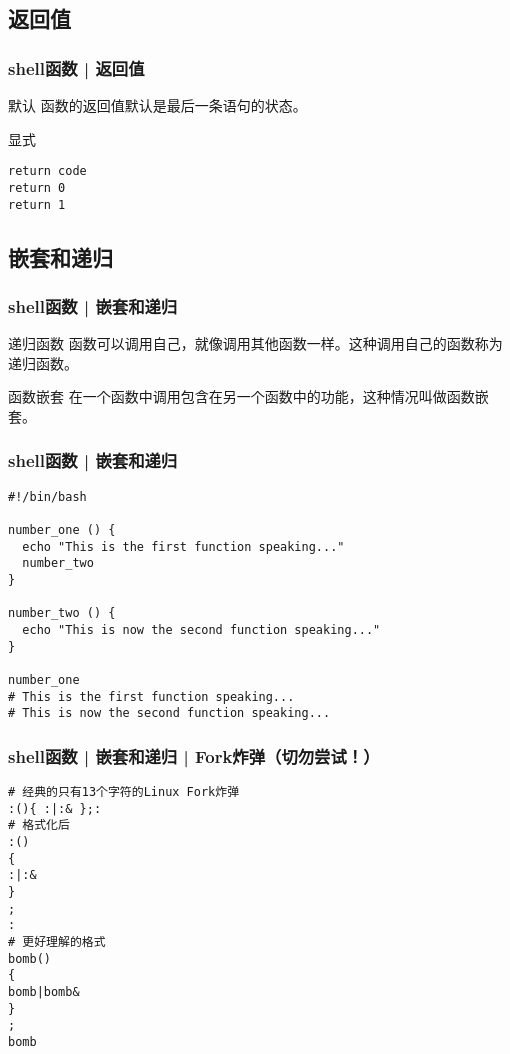 \subsection{返回值}
\begin{frame}[fragile]
  \frametitle{shell函数 | \alert{返回值}}
  \begin{block}{默认}
    函数的返回值默认是最后一条语句的状态。
  \end{block}
  \pause
  \begin{block}{显式}
\begin{lstlisting}
return code
return 0 
return 1 
\end{lstlisting}
  \end{block}
\end{frame}

\subsection{嵌套和递归}
\begin{frame}[fragile]
  \frametitle{shell函数 | 嵌套和递归}
  \begin{block}{递归函数}
  函数可以调用自己，就像调用其他函数一样。这种调用自己的函数称为递归函数。
  \end{block}
  \pause
  \begin{block}{函数嵌套}
  在一个函数中调用包含在另一个函数中的功能，这种情况叫做函数嵌套。
  \end{block}
\end{frame}

\begin{frame}[fragile]
  \frametitle{shell函数 | 嵌套和递归}
\begin{lstlisting}
#!/bin/bash

number_one () {
  echo "This is the first function speaking..."
  number_two
}

number_two () {
  echo "This is now the second function speaking..."
}

number_one
# This is the first function speaking...
# This is now the second function speaking...
\end{lstlisting}
\end{frame}

\begin{frame}[fragile]
  \frametitle{shell函数 | 嵌套和递归 | Fork炸弹（\alert{切勿尝试！}）}
\begin{lstlisting}
# 经典的只有13个字符的Linux Fork炸弹
:(){ :|:& };:
# 格式化后
:()
{
:|:&
}
;
:
# 更好理解的格式
bomb()
{
bomb|bomb&
}
;
bomb
\end{lstlisting}
\end{frame}

